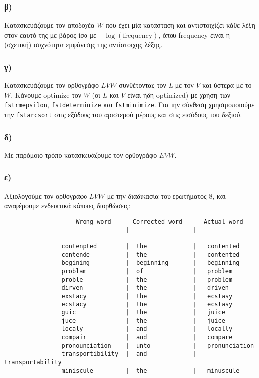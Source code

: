 \documentclass[a4paper, 12pt]{article}
\begin{document}
        \subsubsection*{β)}   
        	Κατασκευάζουμε τον αποδοχέα $W$ που έχει μία κατάσταση και αντιστοιχίζει κάθε λέξη στον εαυτό της με βάρος ίσο με $-\log(\text{frequency})$, όπου frequency είναι η (σχετική) συχνότητα εμφάνισης της αντίστοιχης λέξης.
        	
        \subsubsection*{γ)}   
        	Κατασκευάζουμε τον ορθογράφο $LVW$ συνθέτοντας τον $L$ με τον $V$ και ύστερα με το $W$. Κάνουμε optimize τον $W$ (οι $L$ και $V$ είναι ήδη optimized) με χρήση των \verb|fstrmepsilon|, \verb|fstdeterminize| και \verb|fstminimize|. Για την σύνθεση χρησιμοποιούμε την \verb|fstarcsort| στις εξόδους του αριστερού μέρους και στις εισόδους του δεξιού.
        	
        
        \subsubsection*{δ)}   
        	Με παρόμοιο τρόπο κατασκευάζουμε τον ορθογράφο $EVW$.
        	
        \subsubsection*{ε)}
        	Αξιολογούμε τον ορθογράφο $LVW$ με την διαδικασία του ερωτήματος 8, και αναφέρουμε ενδεικτικά κάποιες διορθώσεις:
        	
        	\begin{verbatim}
        		  	Wrong word      Corrected word      Actual word
	      		------------------|------------------|--------------------
	      		contenpted        |  the             |   contented
	      		contende          |  the             |   contented
	      		begining          |  beginning       |   beginning
	      		problam           |  of              |   problem
	      		proble            |  the             |   problem
	      		dirven            |  the             |   driven
	      		exstacy           |  the             |   ecstasy
	      		ecstacy           |  the             |   ecstasy
	      		guic              |  the             |   juice
	      		juce              |  the             |   juice
	      		localy            |  and             |   locally
	      		compair           |  and             |   compare
	      		pronounciation    |  unto            |   pronunciation
	      		transportibility  |  and             |   transportability
	      		miniscule         |  the             |   minuscule
        	\end{verbatim}
        	
\end{document}
